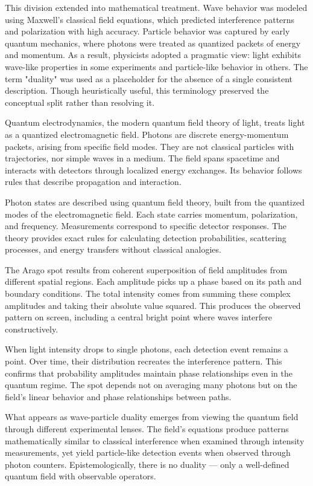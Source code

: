 This division extended into mathematical treatment. Wave behavior was modeled using Maxwell's classical field equations, which predicted interference patterns and polarization with high accuracy. Particle behavior was captured by early quantum mechanics, where photons were treated as quantized packets of energy and momentum. As a result, physicists adopted a pragmatic view: light exhibits wave-like properties in some experiments and particle-like behavior in others. The term "duality" was used as a placeholder for the absence of a single consistent description. Though heuristically useful, this terminology preserved the conceptual split rather than resolving it.

Quantum electrodynamics, the modern quantum field theory of light, treats light as a quantized electromagnetic field. Photons are discrete energy-momentum packets, arising from specific field modes. They are not classical particles with trajectories, nor simple waves in a medium. The field spans spacetime and interacts with detectors through localized energy exchanges. Its behavior follows rules that describe propagation and interaction.

Photon states are described using quantum field theory, built from the quantized modes of the electromagnetic field. Each state carries momentum, polarization, and frequency. Measurements correspond to specific detector responses. The theory provides exact rules for calculating detection probabilities, scattering processes, and energy transfers without classical analogies.

The Arago spot results from coherent superposition of field amplitudes from different spatial regions. Each amplitude picks up a phase based on its path and boundary conditions. The total intensity comes from summing these complex amplitudes and taking their absolute value squared. This produces the observed pattern on screen, including a central bright point where waves interfere constructively.

When light intensity drops to single photons, each detection event remains a point. Over time, their distribution recreates the interference pattern. This confirms that probability amplitudes maintain phase relationships even in the quantum regime. The spot depends not on averaging many photons but on the field's linear behavior and phase relationships between paths.

What appears as wave-particle duality emerges from viewing the quantum field through different experimental lenses. The field's equations produce patterns mathematically similar to classical interference when examined through intensity measurements, yet yield particle-like detection events when observed through photon counters. Epistemologically, there is no duality — only a well-defined quantum field with observable operators.

